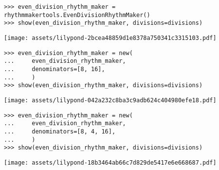 \begin{singlespacing}
\vspace{-0.5\baselineskip}
\begin{lstlisting}
>>> even_division_rhythm_maker = rhythmmakertools.EvenDivisionRhythmMaker()
>>> show(even_division_rhythm_maker, divisions=divisions)
\end{lstlisting}
\noindent\texttt{[image: assets/lilypond-2bcea48859d1e8378a750341c3315103.pdf]}
\end{singlespacing}

\begin{comment}
<abjad>
even_division_rhythm_maker = new(
    even_division_rhythm_maker,
    denominators=[8, 16],
    )
show(even_division_rhythm_maker, divisions=divisions)
</abjad>
\end{comment}

\begin{singlespacing}
\vspace{-0.5\baselineskip}
\begin{lstlisting}
>>> even_division_rhythm_maker = new(
...     even_division_rhythm_maker,
...     denominators=[8, 16],
...     )
>>> show(even_division_rhythm_maker, divisions=divisions)
\end{lstlisting}
\noindent\texttt{[image: assets/lilypond-042a232c8ba3c9adb624c404980efe18.pdf]}
\end{singlespacing}

\begin{comment}
<abjad>
even_division_rhythm_maker = new(
    even_division_rhythm_maker,
    denominators=[8, 4, 16],
    )
show(even_division_rhythm_maker, divisions=divisions)
</abjad>
\end{comment}

\begin{singlespacing}
\vspace{-0.5\baselineskip}
\begin{lstlisting}
>>> even_division_rhythm_maker = new(
...     even_division_rhythm_maker,
...     denominators=[8, 4, 16],
...     )
>>> show(even_division_rhythm_maker, divisions=divisions)
\end{lstlisting}
\noindent\texttt{[image: assets/lilypond-18b3464ab66c7d829de5417e6e668687.pdf]}
\end{singlespacing}

\begin{comment}
<abjad>
even_division_rhythm_maker = new(
    even_division_rhythm_maker,
    denominators=[8],
    extra_counts_per_division=(0, 1),
    )
show(even_division_rhythm_maker, divisions=divisions)
</abjad>
\end{comment}

